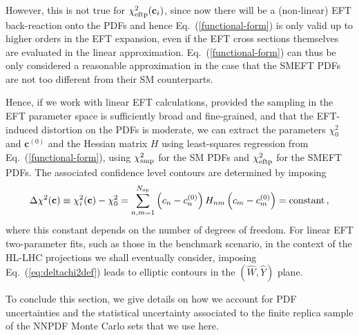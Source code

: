 \documentclass[withindex,glossary]{cam-thesis}
\begin{document}
However, this is not true for $\chi_{\rm eftp}^2({\mathbf{c}_i})$, since now there will be a (non-linear) EFT back-reaction
onto the PDFs and hence Eq.~(\ref{functional-form}) is only valid up
to higher orders in the EFT expansion, even if the EFT cross sections themselves are evaluated in the linear
approximation.
%
Eq.~(\ref{functional-form}) can thus be only considered a reasonable approximation in the case that the SMEFT PDFs are not
too different from their SM counterparts.

Hence, if we work with linear EFT calculations,
provided the sampling in the EFT parameter space is sufficiently broad and fine-grained,
and that the EFT-induced distortion on the PDFs is moderate,
we can extract the parameters $\chi^2_0$ and
${\mathbf{c}}^{(0)}$ and the Hessian matrix $H$ using least-squares regression from Eq.~(\ref{functional-form}),
using $\chi^2_{\rm smp}$ for the SM PDFs and  $\chi^2_{\rm eftp}$ for the SMEFT PDFs.
% 
The associated confidence level contours are determined by imposing
\begin{align}
  \label{eq:deltachi2def}
  \Delta\chi^2({\mathbf c}) \equiv \chi_i^2({\mathbf c})
  - \chi_0^2  = \sum_{n,m=1}^{N_{\rm op}}\left( c_{n} - c^{(0)}_n\right)  H_{nm} 
    \left( c_{m} - c^{(0)}_m\right) =\text{constant}\, ,
\end{align}
where this constant depends on the number of degrees of freedom.
%
For linear EFT two-parameter fits, such as those in the benchmark scenario,
 in the context of the HL-LHC projections we shall eventually consider, 
imposing Eq.~(\ref{eq:deltachi2def}) leads to elliptic
contours in the $( \hat{W},\hat{Y})$ plane.


To conclude this section, we give details on how we account for PDF
uncertainties and the statistical uncertainty associated to the finite
replica sample of the NNPDF Monte Carlo sets that we use here.
\end{document}
